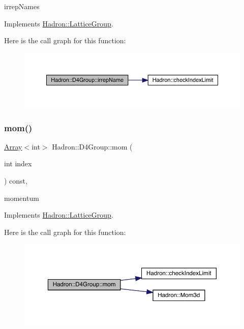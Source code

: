irrep\+Names 

Implements \mbox{\hyperlink{structHadron_1_1LatticeGroup_a4bc5620218c2a73157e19bc4451fe746}{Hadron\+::\+Lattice\+Group}}.

Here is the call graph for this function\+:
\nopagebreak
\begin{figure}[H]
\begin{center}
\leavevmode
\includegraphics[width=350pt]{de/d5e/structHadron_1_1D4Group_a5f121bd08a7add3ddf660c7e3478cb9e_cgraph}
\end{center}
\end{figure}
\mbox{\label{structHadron_1_1D4Group_aeb999dc93b1a1a99ed4ffd53977a163b}} 
\subsubsection{\texorpdfstring{mom()}{mom()}\hspace{0.1cm}{\footnotesize\ttfamily [1/2]}}
{\footnotesize\ttfamily \mbox{\hyperlink{classXMLArray_1_1Array}{Array}}$<$int$>$ Hadron\+::\+D4\+Group\+::mom (\begin{DoxyParamCaption}\item[{int}]{index }\end{DoxyParamCaption}) const\hspace{0.3cm}{\ttfamily [inline]}, {\ttfamily [virtual]}}

momentum 

Implements \mbox{\hyperlink{structHadron_1_1LatticeGroup_ad577b65041dd9a6e84b1f3bd49cb8fce}{Hadron\+::\+Lattice\+Group}}.

Here is the call graph for this function\+:
\nopagebreak
\begin{figure}[H]
\begin{center}
\leavevmode
\includegraphics[width=350pt]{de/d5e/structHadron_1_1D4Group_aeb999dc93b1a1a99ed4ffd53977a163b_cgraph}
\end{center}
\end{figure}
\mbox{\label{structHadron_1_1D4Group_aeb999dc93b1a1a99ed4ffd53977a163b}} 

